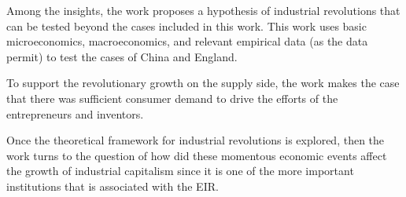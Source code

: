 	Among the insights, the work proposes a hypothesis of industrial revolutions that can be tested beyond the cases included in this work. This work uses basic microeconomics, macroeconomics, and relevant empirical data (as the data permit) to test the cases of China and England.

	To support the revolutionary growth on the supply side, the work makes the case that there was sufficient consumer demand to drive the efforts of the entrepreneurs and inventors.
	
	Once the theoretical framework for industrial revolutions is explored, then the work turns to the question of how did these momentous economic events affect the growth of industrial capitalism since it is one of the more important institutions that is associated with the EIR.
